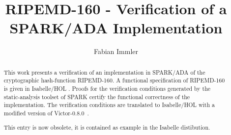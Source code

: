 \documentclass[11pt,a4paper]{article}
\begin{document}
\title{RIPEMD-160 - Verification of a SPARK/ADA Implementation}
\author{Fabian Immler}
\maketitle

\begin{abstract}
This work presents a verification of an implementation in SPARK/ADA \cite{highintegritysoftware} of
the cryptographic hash-function RIPEMD-160. A functional specification of RIPEMD-160 \cite{ripemd}
is given in Isabelle/HOL \cite{LNCS2283}. Proofs for the verification conditions generated by the
static-analysis toolset of SPARK certify the functional correctness of the implementation.
The verification conditions are translated to Isabelle/HOL with a modified version of
Victor-0.8.0~\cite{vct}.

This entry is now obsolete, it is contained as example in the Isabelle distibution.
\end{abstract}





\end{document}
